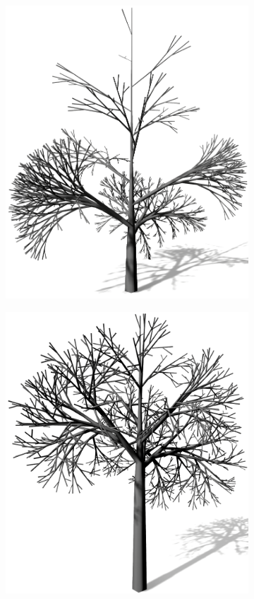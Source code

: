 \begin{figure} [hbtp]
\begin{subfigure}[t]{.45\textwidth}
		\includegraphics[width=\linewidth]{images/LS_Monopodial_2.png}
		\caption{}
		\label{subfig:LS_Monopodial_2}
	\end{subfigure}	
	\begin{subfigure}[t]{.45\textwidth}
		\centering
		\includegraphics[width=\linewidth]{images/LS_Monopodial_3.png}

\end{subfigure}
\end{figure}
